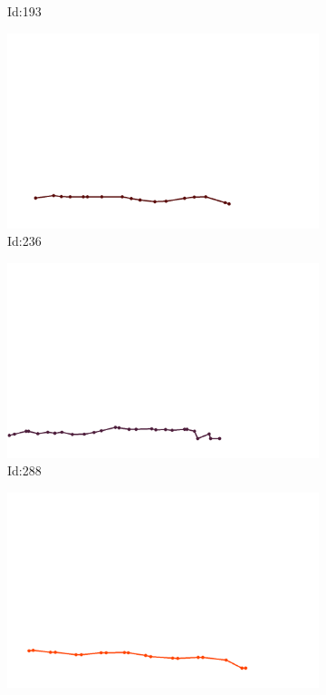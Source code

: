\documentclass[12pt,twoside]{report}
\begin{document}
\begin{figure}
\begin{subfigure}[b]{0.20\textwidth}
\caption{Id:193}
\end{subfigure}
\begin{subfigure}[b]{0.20\textwidth}
\centering
\includegraphics[width=\textwidth]{../../trajectories/236.png}
\caption{Id:236}
\end{subfigure}
\begin{subfigure}[b]{0.20\textwidth}
\centering
\includegraphics[width=\textwidth]{../../trajectories/288.png}
\caption{Id:288}
\end{subfigure}
\begin{subfigure}[b]{0.20\textwidth}
\centering
\includegraphics[width=\textwidth]{../../trajectories/328.png}

\end{subfigure}
\end{figure}
\end{document}

